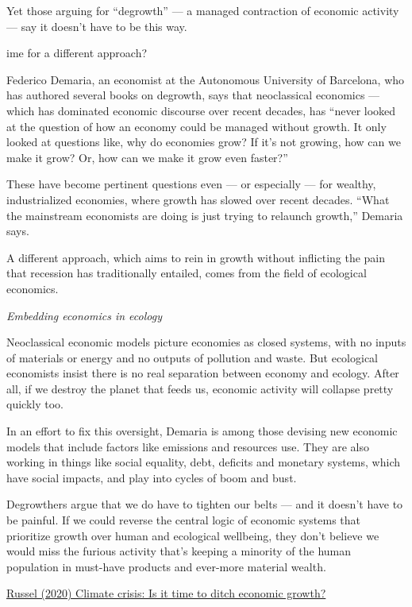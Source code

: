 \documentclass[
]{book}
\begin{document}
Yet those arguing for ``degrowth'' --- a managed contraction of economic activity--- say it doesn't have to be this way.

ime for a different approach?

Federico Demaria, an economist at the Autonomous University of Barcelona, who has authored several books on degrowth, says that neoclassical economics --- which has dominated economic discourse over recent decades, has ``never looked at the question of how an economy could be managed without growth. It only looked at questions like, why do economies grow? If it's not growing, how can we make it grow? Or, how can we make it grow even faster?''

These have become pertinent questions even --- or especially --- for wealthy, industrialized economies, where growth has slowed over recent decades. ``What the mainstream economists are doing is just trying to relaunch growth,'' Demaria says.

A different approach, which aims to rein in growth without inflicting the pain that recession has traditionally entailed, comes from the field of ecological economics.

\emph{Embedding economics in ecology}

Neoclassical economic models picture economies as closed systems, with no inputs of materials or energy and no outputs of pollution and waste. But ecological economists insist there is no real separation between economy and ecology. After all, if we destroy the planet that feeds us, economic activity will collapse pretty quickly too.

In an effort to fix this oversight, Demaria is among those devising new economic models that include factors like emissions and resources use. They are also working in things like social equality, debt, deficits and monetary systems, which have social impacts, and play into cycles of boom and bust.

Degrowthers argue that we do have to tighten our belts --- and it doesn't have to be painful. If we could reverse the central logic of economic systems that prioritize growth over human and ecological wellbeing, they don't believe we would miss the furious activity that's keeping a minority of the human population in must-have products and ever-more material wealth.

\href{https://www.dw.com/en/climatechange-emissions-fossilfuels-gdp-economy-renewables/a-55089013}{Russel (2020) Climate crisis: Is it time to ditch economic growth?}
\end{document}
